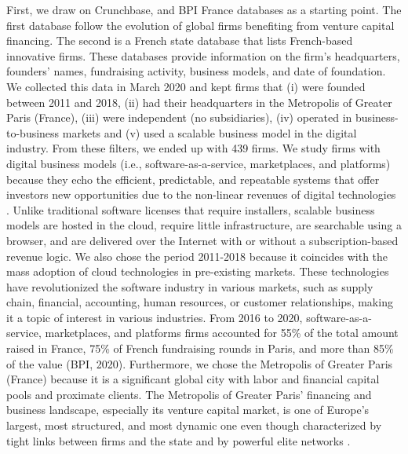 \documentclass[12pt]{article}
\begin{document}
First, we draw on Crunchbase, and BPI France databases as a starting point. The first database follow the evolution of global firms benefiting from venture capital financing. The second is a French state database that lists French-based innovative firms. These databases provide information on the firm’s headquarters, founders’ names, fundraising activity, business models, and date of foundation. We collected this data in March 2020 and kept firms that (i) were founded between 2011 and 2018, (ii) had their headquarters in the Metropolis of Greater Paris (France), (iii) were independent (no subsidiaries), (iv) operated in business-to-business markets and (v) used a scalable business model in the digital industry. From these filters, we ended up with 439 firms. We study firms with digital business models (i.e., software-as-a-service, marketplaces, and platforms) because they echo the efficient, predictable, and repeatable systems that offer investors new opportunities due to the non-linear revenues of digital technologies \citep{nambisan2017digital}. Unlike traditional software licenses that require installers, scalable business models are hosted in the cloud, require little infrastructure, are searchable using a browser, and are delivered over the Internet with or without a subscription-based revenue logic. We also chose the period 2011-2018 because it coincides with the mass adoption of cloud technologies in pre-existing markets. These technologies have revolutionized the software industry in various markets, such as supply chain, financial, accounting, human resources, or customer relationships, making it a topic of interest in various industries. From 2016 to 2020, software-as-a-service, marketplaces, and platforms firms accounted for 55\% of the total amount raised in France, 75\% of French fundraising rounds in Paris, and more than 85\% of the value (BPI, 2020). Furthermore, we chose the Metropolis of Greater Paris (France) because it is a significant global city with labor and financial capital pools and proximate clients. The Metropolis of Greater Paris’ financing and business landscape, especially its venture capital market, is one of Europe’s largest, most structured, and most dynamic one even though characterized by tight links between firms and the state and by powerful elite networks \citep{milosevic2018skills}.
\end{document}

